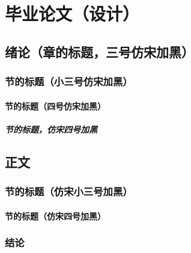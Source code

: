 %
\part{毕业论文（设计）}

\chapter{绪论（章的标题，三号仿宋加黑）}

\section{节的标题（小三号仿宋加黑）}

\subsection{节的标题（四号仿宋加黑）}

\subsubsection{节的标题，仿宋四号加黑}
\cite{small}
\chapter{正文}

\section{节的标题（仿宋小三号加黑）}

\subsection{节的标题（仿宋四号加黑）}

\section{结论}

\printbibliography[heading=chapbib]